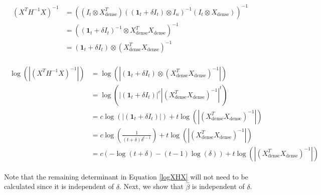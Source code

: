         \begin{align}
        \begin{split}
            (X^TH^{-1}X)^{-1} & = ((I_t \otimes X^T_{\text{dense}})((\mathbf{1}_{t} + \delta I_t) \otimes I_n )^{-1}(I_t \otimes X_{\text{dense}}))^{-1} \\
                              & = ((\mathbf{1}_{t} + \delta I_t)^{-1} \otimes X^T_{\text{dense}}X_{\text{dense}})^{-1} \\
                              & = (\mathbf{1}_{t} + \delta I_t) \otimes (X^T_{\text{dense}}X_{\text{dense}})^{-1}
        \end{split}
        \end{align}
        
        \begin{align}
        \begin{split}
            \log{\left(|(X^TH^{-1}X)^{-1}|\right)} & = \log{(|(\mathbf{1}_{t} + \delta I_t) \otimes (X^T_{\text{dense}}X_{\text{dense}})^{-1}|)} \\
                                      & = \log{(|(\mathbf{1}_{t} + \delta I_t)|^c|(X^T_{\text{dense}}X_{\text{dense}})^{-1}|^t)} \\
                                      & = c\log{(|(\mathbf{1}_{t} + \delta I_t)|)} + t\log{(|(X^T_{\text{dense}}X_{\text{dense}})^{-1}|)} \\
                                      & = c\log{\left(\frac{1}{(t+\delta)\delta^{t-1}}\right)} + t\log{(|(X^T_{\text{dense}}X_{\text{dense}})^{-1}|)} \\
                                      & = c\left(-\log{(t+\delta)} - (t-1)\log{(\delta)}\right) + t\log{(|(X^T_{\text{dense}}X_{\text{dense}})^{-1}|)} \label{logXHX}
        \end{split}
        \end{align}
        
        \noindent Note that the remaining determinant in Equation \ref{logXHX} will not need to be calculated since it is independent of $\delta$. Next, we show that $\hat{\beta}$ is independent of $\delta$.
        

